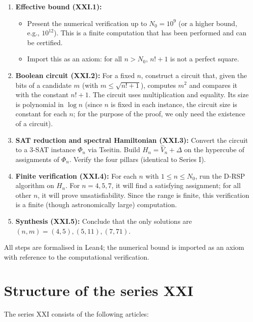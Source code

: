 \documentclass[11pt,a4paper]{article}
\begin{document}
\begin{enumerate}
\item \textbf{Effective bound (XXI.1):} 
   \begin{itemize}
   \item Present the numerical verification up to $N_0 = 10^9$ (or a higher bound, e.g., $10^{12}$). This is a finite computation that has been performed and can be certified.
   \item Import this as an axiom: for all $n > N_0$, $n!+1$ is not a perfect square.
   \end{itemize}
\item \textbf{Boolean circuit (XXI.2):} 
   For a fixed $n$, construct a circuit that, given the bits of a candidate $m$ (with $m \le \sqrt{n!+1}$), computes $m^2$ and compares it with the constant $n!+1$. The circuit uses multiplication and equality. Its size is polynomial in $\log n$ (since $n$ is fixed in each instance, the circuit size is constant for each $n$; for the purpose of the proof, we only need the existence of a circuit).
\item \textbf{SAT reduction and spectral Hamiltonian (XXI.3):} 
   Convert the circuit to a 3‑SAT instance $\Phi_n$ via Tseitin. Build $H_n = \hat{V}_n + \Delta$ on the hypercube of assignments of $\Phi_n$. Verify the four pillars (identical to Series I).
\item \textbf{Finite verification (XXI.4):} 
   For each $n$ with $1 \le n \le N_0$, run the D‑RSP algorithm on $H_n$. For $n = 4,5,7$, it will find a satisfying assignment; for all other $n$, it will prove unsatisfiability. Since the range is finite, this verification is a finite (though astronomically large) computation.
\item \textbf{Synthesis (XXI.5):} 
   Conclude that the only solutions are $(n,m) = (4,5), (5,11), (7,71)$.
\end{enumerate}

All steps are formalised in Lean4; the numerical bound is imported as an axiom with reference to the computational verification.

\section{Structure of the series XXI}

The series XXI consists of the following articles:
\end{document}
